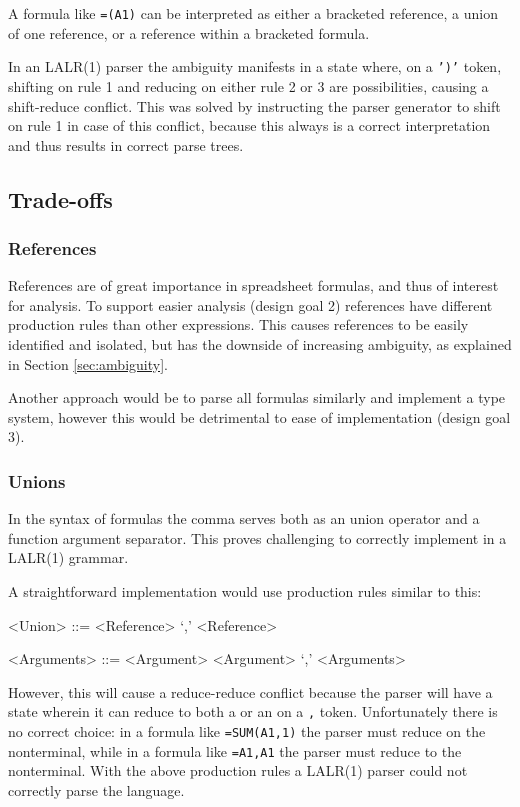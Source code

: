 \documentclass[conference]{IEEEtran}
\begin{document}
A formula like \texttt{=(A1)} can be interpreted as either a bracketed reference, a union of one reference, or a reference within a bracketed formula.

In an LALR(1) parser the ambiguity manifests in a state where, on a \texttt{')'} token, shifting on rule 1 and reducing on either rule 2 or 3 are possibilities, causing a shift-reduce conflict.
This was solved by instructing the parser generator to shift on rule 1 in case of this conflict, because this always is a correct interpretation and thus results in correct parse trees.

\subsection{Trade-offs}

\subsubsection{\textbf{References}}
\label{tradeoff:references}

References are of great importance in spreadsheet formulas, and thus of interest for analysis.
To support easier analysis (design goal 2) references have different production rules than other expressions.
This causes references to be easily identified and isolated, but has the downside of increasing ambiguity, as explained in Section \ref{sec:ambiguity}. 

Another approach would be to parse all formulas similarly and implement a type system, however this would be detrimental to ease of implementation (design goal 3).

\subsubsection{\textbf{Unions}}
\label{subsec:desing:unions}

In the syntax of formulas the comma serves both as an union operator and a function argument separator.
This proves challenging to correctly implement in a LALR(1) grammar.

A straightforward implementation would use production rules similar to this:
\begin{grammar}
<Union> ::= <Reference> `,' <Reference>

<Arguments> ::= <Argument>
	\alt <Argument> `,' <Arguments>
\end{grammar}

However, this will cause a reduce-reduce conflict because the parser will have a state wherein it can reduce to both a  or an  on a \texttt{,} token.
Unfortunately there is no correct choice: in a formula like \texttt{=SUM(A1,1)} the parser must reduce on the  nonterminal, while in a formula like \texttt{=A1,A1} the parser must reduce to the  nonterminal.
With the above production rules a LALR(1) parser could not correctly parse the language.
\end{document}
